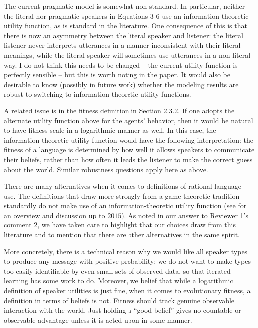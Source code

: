 \documentclass[12pt,a4paper]{article}
\begin{document}
\begin{mdframed}[backgroundcolor=gray!25,linecolor=gray!25,frametitle= Reviewer \thereviewerCounter~comment \thereviewerCommentCounter \hfill ~~({\it definitions in rational language use})]
%
The current pragmatic model is somewhat non-standard. In particular, neither the literal nor pragmatic speakers in Equations 3-6 use an information-theoretic utility function, as is standard in the literature. One consequence of this is that there is now an asymmetry between the literal speaker and listener: the literal listener never interprets utterances in a manner inconsistent with their literal meanings, while the literal speaker will sometimes use utterances in a non-literal way. I do not think this needs to be changed -- the current utility function is perfectly sensible -- but this is worth noting in the paper. It would also be desirable to know (possibly in future work) whether the modeling results are robust to switching to information-theoretic utility functions.

%
\end{mdframed}
\begin{mdframed}[backgroundcolor=gray!25,linecolor=gray!25]
%
A related issue is in the fitness definition in Section 2.3.2. If one adopts the alternate utility function above for the agents' behavior, then it would be natural to have fitness scale in a logarithmic manner as well. In this case, the information-theoretic utility function would have the following interpretation: the fitness of a language is determined by how well it allows speakers to communicate their beliefs, rather than how often it leads the listener to make the correct guess about the world. Similar robustness questions apply here as above.

%
\end{mdframed}
There are many alternatives when it comes to definitions of rational language use. The definitions that draw more strongly from a game-theoretic tradition standardly do not make use of an information-theoretic utility function (see \citealt{qing+franke:2015} for an overview and discussion up to $2015$). As noted in our answer to Reviewer 1's comment 2, we have taken care to highlight that our choices draw from this literature and to mention that there are other alternatives in the same spirit. 

More concretely, there is a technical reason why we would like all speaker types to produce any message with positive probability: we do not want to make types too easily identifiable by even small sets of observed data, so that iterated learning has some work to do. Moreover, we belief that while a logarithmic definition of speaker utilities is just fine, when it comes to evolutionary fitness, a definition in terms of beliefs is not. Fitness should track genuine observable interaction with the world. Just holding a ``good belief'' gives no countable or observable advantage unless it is acted upon in some manner. 
\end{document}

